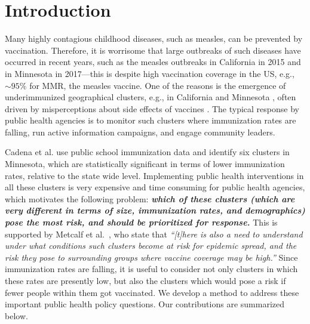\section{Introduction}
Many highly contagious childhood diseases, such as measles, can be prevented by
vaccination. Therefore, it is worrisome that large outbreaks of such diseases 
have occurred in recent years, such as the measles
outbreaks in California in 2015 and in Minnesota in 2017---this is
despite high vaccination coverage in the US, e.g., $\sim 95\%$ for MMR, the measles vaccine. 
One of the reasons is the emergence of underimmunized geographical clusters, e.g., in California \cite{lieu2015geographic}
and Minnesota \cite{cadena:vacc-cluster}, often driven by misperceptions about 
side effects of vaccines \cite{atwell:pediatrics13}.  The typical response by public
health agencies is to monitor such clusters where immunization rates are falling, run active information campaigns, and engage community leaders. 

Cadena et al. \cite{cadena:vacc-cluster} use public school immunization data and identify six clusters in Minnesota,
which are statistically significant in terms of lower immunization rates, relative to the state wide level.
Implementing public health interventions in all these clusters is very expensive and time consuming for
public health agencies, which motivates the following problem: \textbf{\emph{which of these clusters (which are very different
in terms of size, immunization rates, and demographics) pose the most risk, and should be prioritized for response.}}
This is supported by Metcalf et al.~\cite{metcalf:epidemics15},
who state that \emph{``[t]here is also a need to understand under what conditions such clusters become at 
risk for epidemic spread, and the risk they pose to surrounding groups where vaccine coverage may be high.''} 
Since immunization rates are falling, it is useful to consider not only clusters in which these rates
are presently low, but also the clusters which would pose a risk if fewer people within them got vaccinated.
We develop a method to address these important public health policy questions.
Our contributions are summarized below.
\smallskip




